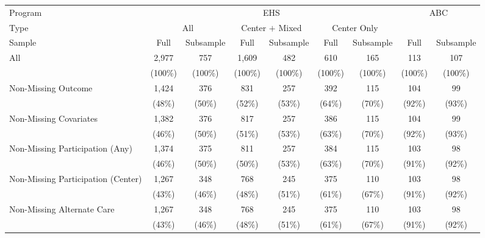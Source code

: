 \begin{tabular}{lcccccccc}
\toprule 
\midrule 
Program & \multicolumn{6}{c}{EHS} & \multicolumn{2}{c}{ABC} \\
 \cmidrule(lr){1-1} \cmidrule(lr){2-7} \cmidrule(lr){8-9} 
Type & \multicolumn{2}{c}{All} & \multicolumn{2}{c}{Center $+$ Mixed} & \multicolumn{2}{c}{Center Only} & \multicolumn{2}{c}{} \\
 \cmidrule(lr){1-1} \cmidrule(lr){2-3} \cmidrule(lr){4-5} \cmidrule(lr){6-7} \cmidrule(lr){8-9} 
Sample & Full & Subsample & Full & Subsample & Full & Subsample & Full & Subsample \\
\midrule 
All & 2,977 & 757 & 1,609 & 482 & 610 & 165 & 113 & 107 \\
 & (100\%) & (100\%) & (100\%) & (100\%) & (100\%) & (100\%) & (100\%) & (100\%) \\
Non-Missing Outcome & 1,424 & 376 & 831 & 257 & 392 & 115 & 104 & 99 \\
 & (48\%) & (50\%) & (52\%) & (53\%) & (64\%) & (70\%) & (92\%) & (93\%) \\
Non-Missing Covariates & 1,382 & 376 & 817 & 257 & 386 & 115 & 104 & 99 \\
 & (46\%) & (50\%) & (51\%) & (53\%) & (63\%) & (70\%) & (92\%) & (93\%) \\
Non-Missing Participation (Any) & 1,374 & 375 & 811 & 257 & 384 & 115 & 103 & 98 \\
 & (46\%) & (50\%) & (50\%) & (53\%) & (63\%) & (70\%) & (91\%) & (92\%) \\
Non-Missing Participation (Center) & 1,267 & 348 & 768 & 245 & 375 & 110 & 103 & 98 \\
 & (43\%) & (46\%) & (48\%) & (51\%) & (61\%) & (67\%) & (91\%) & (92\%) \\
Non-Missing Alternate Care & 1,267 & 348 & 768 & 245 & 375 & 110 & 103 & 98 \\
 & (43\%) & (46\%) & (48\%) & (51\%) & (61\%) & (67\%) & (91\%) & (92\%) \\
\midrule 
\bottomrule 
\end{tabular}
